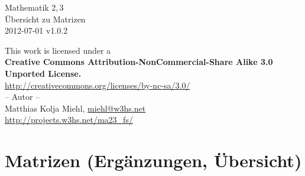 \documentclass[a4paper,10pt,titlepage]{scrartcl}
\makeatletter
\newcommand{\projectURL}{http://projects.w3hs.net/ma23\_fs/}
\newcommand{\thisdocDATE}{2012-07-01 v1.0.2}
\newcommand{\myNAME}{Matthias Kolja Miehl}
\newcommand{\myEMAIL}{miehl@w3hs.net}
\makeatother
\begin{document}

\begin{titlepage}
  \vspace*{\fill}
  \begin{center}
    \huge
    Mathematik 2,\,3\\
    Übersicht zu Matrizen\\
    \vspace{1.5cm}
    \large
    \thisdocDATE
  \end{center}
  \vspace*{\fill}
  \begin{center}{\fontsize{9pt}{11pt}\selectfont
    This work is licensed under a\\[1em]
    \textbf{Creative Commons Attribution-NonCommercial-Share Alike 3.0 Unported License.\\[1em]}
    \url{http://creativecommons.org/licenses/by-nc-sa/3.0/}\\
  }
  \vspace*{\fill}
%
  -- Autor -- \medskip\\
  \myNAME, \href{mailto:\myEMAIL}{\myEMAIL}\smallskip\\
  \url{\projectURL}
  \vspace*{1cm}
  \end{center}
\end{titlepage}

\newpage

\setcounter{page}{1}


\section*{Matrizen (Ergänzungen, Übersicht)}
\label{sec:matrizen}
\end{document}
